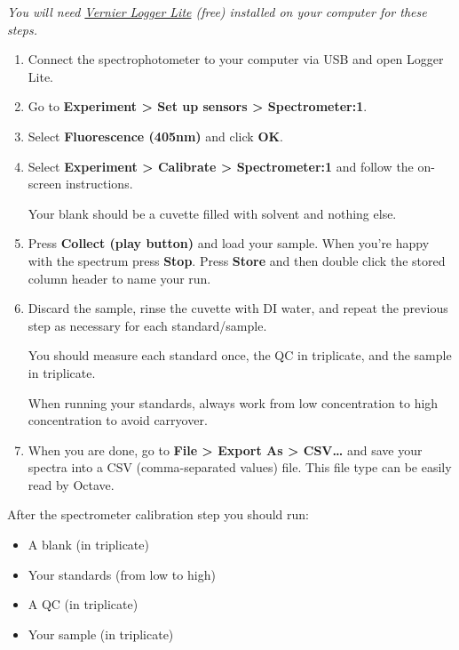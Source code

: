 \documentclass[]{tufte-book}
\providecommand{\tightlist}{%
  \setlength{\itemsep}{0pt}\setlength{\parskip}{0pt}}
\begin{document}
\emph{You will need \href{https://www.vernier.com/products/software/logger-lite/\#section5}{Vernier Logger Lite} (free) installed on your computer for these steps.}

\begin{enumerate}
\def\labelenumi{\arabic{enumi}.}
\item
  Connect the spectrophotometer to your computer via USB and open Logger Lite.\\
\item
  Go to \textbf{Experiment \textgreater{} Set up sensors \textgreater{} Spectrometer:1}.\\
\item
  Select \textbf{Fluorescence (405nm)} and click \textbf{OK}.\\
\item
  Select \textbf{Experiment \textgreater{} Calibrate \textgreater{} Spectrometer:1} and follow the on-screen instructions.

  \begin{marginfigure}
   Your blank should be a cuvette filled with solvent and nothing else.
   \end{marginfigure}
\item
  Press \textbf{Collect (play button)} and load your sample. When you're happy with the spectrum press \textbf{Stop}. Press \textbf{Store} and then double click the stored column header to name your run.
\item
  Discard the sample, rinse the cuvette with DI water, and repeat the previous step as necessary for each standard/sample.

  \begin{marginfigure}
   You should measure each standard once, the QC in triplicate, and the
   sample in triplicate.

   When running your standards, always work from low concentration to high
   concentration to avoid carryover.
   \end{marginfigure}
\item
  When you are done, go to \textbf{File \textgreater{} Export As \textgreater{} CSV\ldots{}} and save your spectra into a CSV (comma-separated values) file. This file type can be easily read by Octave.
\end{enumerate}

After the spectrometer calibration step you should run:

\begin{itemize}
\tightlist
\item
  A blank (in triplicate)
\item
  Your standards (from low to high)
\item
  A QC (in triplicate)
\item
  Your sample (in triplicate)
\end{itemize}
\end{document}
